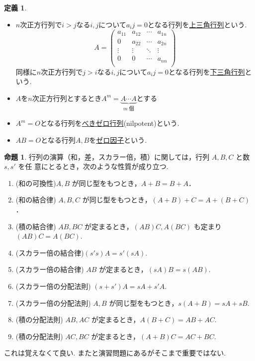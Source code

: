 \documentclass[dvipdfmx,a4paper,11pt]{article} %
\theoremstyle{definition}
\newtheorem{prop}[thm]{命題}
\newtheorem{dfn}[thm]{定義}
\begin{document}
\begin{dfn}
\begin{itemize}
$$\begin{pmatrix}
1
 \end{pmatrix}, 
 E_3=
   \begin{pmatrix}
1&0 &0\\
0 &1 &0\\
0&0&1
 \end{pmatrix}
 $$
 \item  $n$次正方行列で$i>j$なる$i,j$について$a_ij=0$となる行列を\underline{上三角行列}という.
 $$
 A =
 \begin{pmatrix}
a_{11}& a_{12} & \cdots &a_{1n} \\
0& a_{22} & \cdots &a_{2n} \\
\vdots& \vdots	&	\ddots   &	\vdots \\
0&0  & \cdots &a_{nn} \\
\end{pmatrix}
 $$
同様に$n$次正方行列で$j>i$なる$i,j$について$a_ij=0$となる行列を\underline{下三角行列}という.
\item $A$を$n$次正方行列とするとき$A^{m} = \underbrace{A \cdots A}_{m \text{ 個}}$とする
\item $A^{m}=O$となる行列を\underline{べきゼロ行列}(nilpotent)という.
\item $AB=O$となる行列$A, B$を\underline{ゼロ因子}という. 
 \end{itemize}
  \end{dfn}


\begin{prop}\cite[問題 2.1.3, 2.1.4]{O}
行列の演算（和，差，スカラー倍，積）に関しては，行列 \( A, B, C \) と数 \( s, s' \) を任
意にとるとき，次のような性質が成り立つ. 

\begin{enumerate}
\setlength{\parskip}{0cm}
 \setlength{\itemsep}{0pt} 
\item (和の可換性)\( A, B \) が同じ型をもつとき，\( A+B=B+A \)．
\item (和の結合律) \( A, B, C \) が同じ型をもつとき，\( (A+B)+C=A+(B+C) \)．
\item (積の結合律) \( AB, BC \) が定まるとき，\( (AB)C, A(BC) \) も定まり \( (AB)C=A(BC) \).
\item (スカラー倍の結合律)\( (s's)A=s'(sA) \).
\item (スカラー倍の結合律) \( AB \) が定まるとき，\( (sA)B=s(AB) \).
\item (スカラー倍の分配法則) \( (s+s')A=sA+s'A \).
\item (スカラー倍の分配法則) \( A, B \) が同じ型をもつとき，\( s(A+B)=sA+sB \).
\item (積の分配法則) \( AB, AC \) が定まるとき，\( A(B+C)=AB+AC \).
\item (積の分配法則) \( AC, BC \) が定まるとき，\( (A+B)C=AC+BC \).
\end{enumerate}
\end{prop}
これは覚えなくて良い. また\cite[問題 2.1.3, 2.1.4]{O}と演習問題にあるがそこまで重要ではない. 
\end{document}
